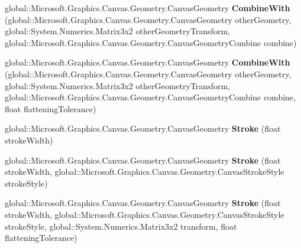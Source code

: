 \begin{DoxyCompactItemize}
global\+::\+Microsoft.\+Graphics.\+Canvas.\+Geometry.\+Canvas\+Geometry {\bfseries Combine\+With} (global\+::\+Microsoft.\+Graphics.\+Canvas.\+Geometry.\+Canvas\+Geometry other\+Geometry, global\+::\+System.\+Numerics.\+Matrix3x2 other\+Geometry\+Transform, global\+::\+Microsoft.\+Graphics.\+Canvas.\+Geometry.\+Canvas\+Geometry\+Combine combine)
\item 
\mbox{\label{class_microsoft_1_1_graphics_1_1_canvas_1_1_geometry_1_1_canvas_geometry_adad804adc3470601bc8179651be8521e}} 
global\+::\+Microsoft.\+Graphics.\+Canvas.\+Geometry.\+Canvas\+Geometry {\bfseries Combine\+With} (global\+::\+Microsoft.\+Graphics.\+Canvas.\+Geometry.\+Canvas\+Geometry other\+Geometry, global\+::\+System.\+Numerics.\+Matrix3x2 other\+Geometry\+Transform, global\+::\+Microsoft.\+Graphics.\+Canvas.\+Geometry.\+Canvas\+Geometry\+Combine combine, float flattening\+Tolerance)
\item 
\mbox{\label{class_microsoft_1_1_graphics_1_1_canvas_1_1_geometry_1_1_canvas_geometry_a8af3ce8304eae3ecf06add5210d5b498}} 
global\+::\+Microsoft.\+Graphics.\+Canvas.\+Geometry.\+Canvas\+Geometry {\bfseries Stroke} (float stroke\+Width)
\item 
\mbox{\label{class_microsoft_1_1_graphics_1_1_canvas_1_1_geometry_1_1_canvas_geometry_aa6cb309b9284fbf870333f012b0bdf86}} 
global\+::\+Microsoft.\+Graphics.\+Canvas.\+Geometry.\+Canvas\+Geometry {\bfseries Stroke} (float stroke\+Width, global\+::\+Microsoft.\+Graphics.\+Canvas.\+Geometry.\+Canvas\+Stroke\+Style stroke\+Style)
\item 
\mbox{\label{class_microsoft_1_1_graphics_1_1_canvas_1_1_geometry_1_1_canvas_geometry_acd5ab184e01cc9bd574ccbe0932c0dfd}} 
global\+::\+Microsoft.\+Graphics.\+Canvas.\+Geometry.\+Canvas\+Geometry {\bfseries Stroke} (float stroke\+Width, global\+::\+Microsoft.\+Graphics.\+Canvas.\+Geometry.\+Canvas\+Stroke\+Style stroke\+Style, global\+::\+System.\+Numerics.\+Matrix3x2 transform, float flattening\+Tolerance)
\item 
\mbox{\label{class_microsoft_1_1_graphics_1_1_canvas_1_1_geometry_1_1_canvas_geometry_a2a21e622cb17f94954463d620c8ba650}} 

\end{DoxyCompactItemize}
